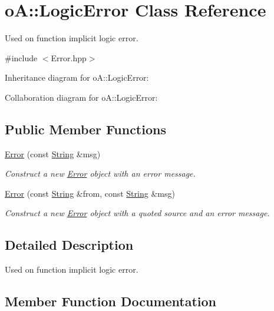 \hypertarget{classo_a_1_1_logic_error}{}\section{oA\+:\+:Logic\+Error Class Reference}
\label{classo_a_1_1_logic_error}


Used on function implicit logic error.  




{\ttfamily \#include $<$Error.\+hpp$>$}



Inheritance diagram for oA\+:\+:Logic\+Error\+:


Collaboration diagram for oA\+:\+:Logic\+Error\+:
\subsection*{Public Member Functions}
\begin{DoxyCompactItemize}
\item 
\mbox{\hyperlink{classo_a_1_1_logic_error_a16d10704561d2b756722d71d8703089c}{Error}} (const \mbox{\hyperlink{classo_a_1_1_string}{String}} \&msg)
\begin{DoxyCompactList}\small\item\em Construct a new \mbox{\hyperlink{classo_a_1_1_error}{Error}} object with an error message. \end{DoxyCompactList}\item 
\mbox{\hyperlink{classo_a_1_1_logic_error_adf66492ca8b03fa14d09e5bba7cdacbd}{Error}} (const \mbox{\hyperlink{classo_a_1_1_string}{String}} \&from, const \mbox{\hyperlink{classo_a_1_1_string}{String}} \&msg)
\begin{DoxyCompactList}\small\item\em Construct a new \mbox{\hyperlink{classo_a_1_1_error}{Error}} object with a quoted source and an error message. \end{DoxyCompactList}\end{DoxyCompactItemize}


\subsection{Detailed Description}
Used on function implicit logic error. 

\subsection{Member Function Documentation}
\mbox{\label{classo_a_1_1_logic_error_a16d10704561d2b756722d71d8703089c}} 
